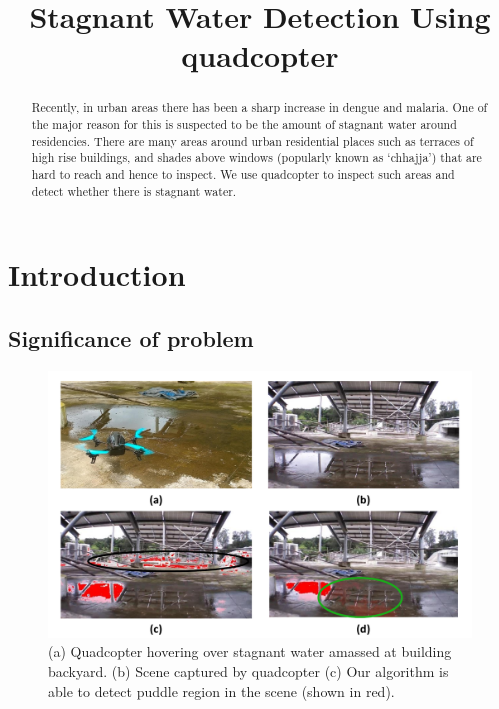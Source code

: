 \documentclass[times,10pt,twocolumn,letterpaper]{article}
\title{Stagnant Water Detection Using quadcopter}
\author{}
\begin{document}
\maketitle

\begin{abstract}
Recently, in urban areas there has been a sharp increase in dengue and malaria.
One of the major reason for this is suspected to be the amount of stagnant
water around residencies. There are many areas around urban residential places
such as terraces of high rise buildings, and shades above windows
(popularly known as `chhajja') that are hard to reach and hence to inspect. We
use quadcopter to inspect such areas and detect whether there is stagnant water.

\end{abstract}

\section{Introduction}

\subsection{Significance of problem}
\cite{NVBDP_Malaria} \cite{WHO15Malaria} \cite{Cecilia14}  \cite{NVBDP_Dengue}
\cite{WHO15Dengue}

\begin{figure}[h!]
\centering
\includegraphics[width=\linewidth]{images/teaser.pdf}
\caption{(a) Quadcopter hovering over stagnant water amassed at building
backyard. (b) Scene captured by quadcopter (c) Our algorithm is able to detect
puddle region in the scene (shown in red).}
\end{figure}
\end{document}
